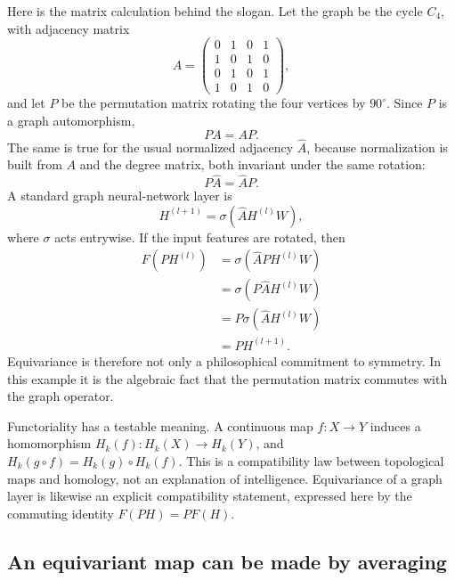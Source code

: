 Here is the matrix calculation behind the slogan.  Let the graph be the cycle \(C_4\), with adjacency matrix
\[
  A=
  \begin{pmatrix}
  0&1&0&1\\
  1&0&1&0\\
  0&1&0&1\\
  1&0&1&0
  \end{pmatrix},
\]
and let \(P\) be the permutation matrix rotating the four vertices by \(90^\circ\).  Since \(P\) is a graph automorphism,
\[
  PA=AP.
\]
The same is true for the usual normalized adjacency \(\widehat A\), because normalization is built from \(A\) and the degree matrix, both invariant under the same rotation:
\[
  P\widehat A=\widehat A P.
\]
A standard graph neural-network layer is
\[
  H^{(l+1)}=\sigma(\widehat A H^{(l)}W),
\]
where \(\sigma\) acts entrywise.  If the input features are rotated, then
\[
\begin{aligned}
  F(PH^{(l)})
  &=\sigma(\widehat A PH^{(l)}W)\\
  &=\sigma(P\widehat A H^{(l)}W)\\
  &=P\sigma(\widehat A H^{(l)}W)\\
  &=PH^{(l+1)}.
\end{aligned}
\]
Equivariance is therefore not only a philosophical commitment to symmetry.  In this example it is the algebraic fact that the permutation matrix commutes with the graph operator.

Functoriality has a testable meaning. A continuous map $f:X\to Y$ induces a homomorphism $H_k(f):H_k(X)\to H_k(Y)$, and $H_k(g\circ f)=H_k(g)\circ H_k(f)$. This is a compatibility law between topological maps and homology, not an explanation of intelligence. Equivariance of a graph layer is likewise an explicit compatibility statement, expressed here by the commuting identity $F(PH)=PF(H)$.

\subsection*{An equivariant map can be made by averaging}

